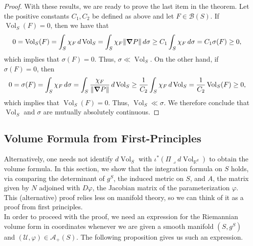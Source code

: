 \documentclass{article}
\newcommand{\R}{\mathbb{R}}
\newcommand{\f}[2]{\frac{#1}{#2}}
\newcommand{\iprod}{\mathbin{\lrcorner}}
\theoremstyle{theorem}
\newcommand{\Vol}{\operatorname{Vol}}
\begin{document}
\begin{proof}
With these results, we are ready to prove the last item in the theorem. Let the positive constants $C_1,C_2$ be defined as above and let $F\in \mathcal{B}(S)$. If $\Vol_S(F) = 0$, then we have that
\begin{equation*}
    0 = \Vol_S(F) = \int_S \chi_F \,d\Vol_S = \int_S \chi_F \norm{\grad P }\,d\sigma \geq C_1 \int_S \chi_F \,d\sigma = C_1 \sigma(F) \geq 0,
\end{equation*}
which implies that $\sigma(F) = 0$. Thus, $\sigma \ll \Vol_S$. On the other hand, if $\sigma(F) = 0$, then
\begin{equation*}
    0 = \sigma(F) = \int_S \chi_F \,d\sigma= \int_S \frac{\chi_F }{ \norm{\grad P } }\,d\Vol_S \geq \f{1}{C_2} \int_S \chi_F \,d\Vol_S = \f{1}{C_2} \Vol_S(F) \geq 0,
\end{equation*}
which implies that $\Vol_S(F) = 0$. Thus, $\Vol_S \ll \sigma$. We therefore conclude that $\Vol_S$ and $\sigma$ are mutually absolutely continuous.




\end{proof}


\subsection{Volume Formula from First-Principles}

Alternatively, one needs not identify $d\Vol_S$ with $\iota^* (\Pi \iprod d\Vol_{\R^d})$ to obtain the volume formula. In this section, we show that the integration formula on $S$ holds, via comparing the determinant of $g^S$, the induced metric on $S$, and $A$, the matrix given by $N$ adjoined with $D\varphi$, the Jacobian matrix of the parameterization $\varphi$. This (alternative) proof relies less on manifold theory, so we can think of it as a proof from first principles. \\


In order to proceed with the proof, we need an expression for the Riemannian volume form in coordinates whenever we are given a smooth manifold $(S,g^S)$ and $(\mathcal{U}, \varphi) \in \mathcal{A}_+(S)$. The following proposition gives us such an expression.
\end{document}

